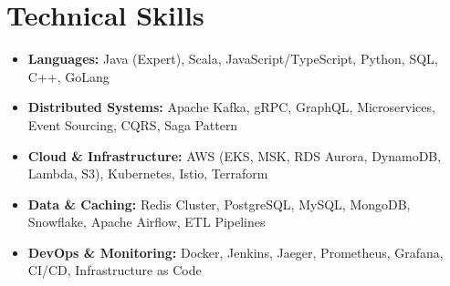\documentclass[letterpaper,11pt]{article}
\begin{document}
\section{Technical Skills}
  \begin{itemize}[leftmargin=*, itemsep=1pt, parsep=0pt, topsep=0pt]
    \item \textbf{Languages:} Java (Expert), Scala, JavaScript/TypeScript, Python, SQL, C++, GoLang
    \item \textbf{Distributed Systems:} Apache Kafka, gRPC, GraphQL, Microservices, Event Sourcing, CQRS, Saga Pattern
    \item \textbf{Cloud \& Infrastructure:} AWS (EKS, MSK, RDS Aurora, DynamoDB, Lambda, S3), Kubernetes, Istio, Terraform
    \item \textbf{Data \& Caching:} Redis Cluster, PostgreSQL, MySQL, MongoDB, Snowflake, Apache Airflow, ETL Pipelines
    \item \textbf{DevOps \& Monitoring:} Docker, Jenkins, Jaeger, Prometheus, Grafana, CI/CD, Infrastructure as Code
  \end{itemize}

\end{document}
